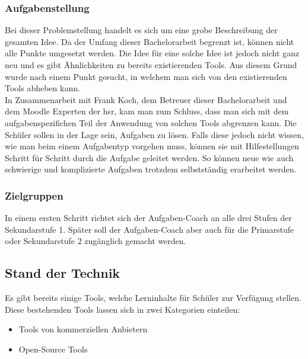 \subsubsection{Aufgabenstellung}
Bei dieser Problemstellung handelt es sich um eine grobe Beschreibung der gesamten Idee. Da der Umfang dieser Bachelorarbeit begrenzt ist, können nicht alle Punkte umgesetzt werden. Die Idee für eine solche Idee ist jedoch nicht ganz neu und es gibt Ähnlichkeiten zu bereits existierenden Tools. Aus diesem Grund wurde nach einem Punkt gesucht, in welchem man sich von den existierenden Tools abheben kann. \\

In Zusammenarbeit mit Frank Koch, dem Betreuer dieser Bachelorarbeit und dem Moodle Experten der \gls{hsr}, kam man zum Schluss, dass man sich mit dem aufgabenspezifichen Teil der Anwendung von solchen Tools abgrenzen kann. Die Schüler sollen in der Lage sein, Aufgaben zu lösen. Falls diese jedoch nicht wissen, wie man beim einem Aufgabentyp vorgehen muss, können sie mit Hilfestellungen Schritt für Schritt durch die Aufgabe geleitet werden. So können neue wie auch schwierige und komplizierte Aufgaben trotzdem selbstständig erarbeitet werden. \\

\subsubsection{Zielgruppen}
In einem ersten Schritt richtet sich der Aufgaben-Coach an alle drei Stufen der Sekundarstufe 1. Später soll der Aufgaben-Coach aber auch für die Primarstufe oder Sekundarstufe 2 zugänglich gemacht werden. 

\subsection{Stand der Technik}
Es gibt bereits einige Tools, welche Lerninhalte für Schüler zur Verfügung stellen. Diese bestehenden Tools lassen sich in zwei Kategorien einteilen:
\begin{itemize}
	\item Tools von kommerziellen Anbietern
	\item Open-Source Tools
\end{itemize}

